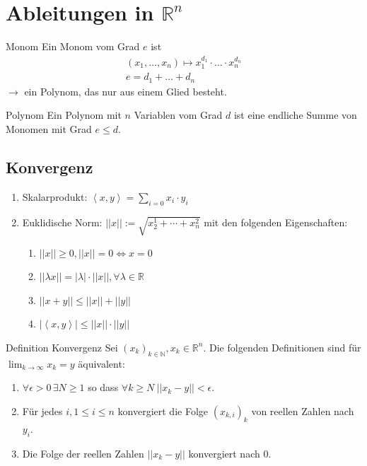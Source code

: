 \documentclass[a4paper,10pt]{article}
\def\R{\mathbb{R}}
\begin{document}
\section{Ableitungen in \texorpdfstring{\(\R^n\)}{Rⁿ}}
\begin{subbox}{Monom}
  Ein Monom vom Grad \(e\) ist
  \begin{align*}
    (x_1, \ldots, x_n) \mapsto x_1^{d_1}\cdot \ldots \cdot x_n^{d_n} \\
    e = d_1 + \ldots + d_n 
  \end{align*}
  \(\to\) ein Polynom, das nur aus einem Glied besteht.
\end{subbox}
\begin{mainbox}{Polynom}
  Ein Polynom mit \(n\) Variablen vom Grad \(d\) ist eine endliche Summe von Monomen mit Grad \(e \le d\).
\end{mainbox}

\subsection{Konvergenz}
\begin{enumerate}
  \item Skalarprodukt: \(\left< x,y\right> = \sum_{i=0} x_i \cdot y_i\)
  \item Euklidische Norm: \(||x|| := \sqrt{x_2^1 + \cdots + x_n^2}\) mit den folgenden Eigenschaften:
  \begin{enumerate}
    \item \(||x|| \ge 0, ||x|| = 0 \iff x = 0\)
    \item \(||\lambda x|| = |\lambda| \cdot ||x||, \forall \lambda \in \R\)
    \item \(||x+y|| \le ||x|| + ||y||\)
    \item \(|\left<x,y\right>| \le ||x|| \cdot ||y||\)
  \end{enumerate}
\end{enumerate}

\begin{mainbox}{Definition Konvergenz}
  Sei \((x_k)_{k \in \mathbb{N}}, x_k \in \R^n\). Die folgenden Definitionen sind für \(\lim_{k\to\infty}x_k = y\) äquivalent:
  \begin{enumerate}
    \item \(\forall \epsilon > 0\, \exists N \ge 1\) so dass \(\forall k \ge N \ ||x_k - y|| < \epsilon\).
    \item Für jedes \(i, 1 \le i \le n\) konvergiert die Folge \((x_{k,i})_k\) von reellen Zahlen nach \(y_i\).
    \item Die Folge der reellen Zahlen \(||x_k - y||\) konvergiert nach \(0\).
  \end{enumerate}
\end{mainbox}
\end{document}
